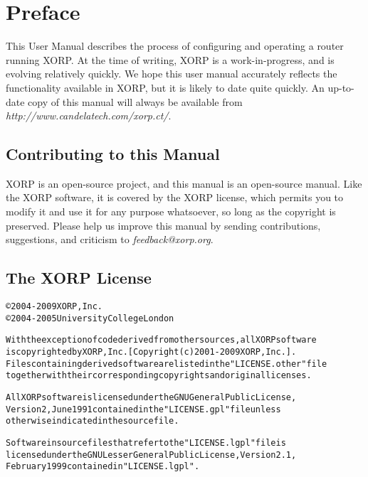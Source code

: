 %
%

\chapter*{Preface}

\vspace{-0.1in}
This User Manual describes the process of configuring and operating a
router running XORP.  At the time of writing, XORP is a
work-in-progress, and is evolving relatively quickly.  We hope this
user manual accurately reflects the functionality available in XORP,
but it is likely to date quite quickly.  An up-to-date copy of this
manual will always be available from {\it http://www.candelatech.com/xorp.ct/}.

\section*{Contributing to this Manual}
\vspace{-0.1in}
XORP is an open-source project, and this manual is an open-source
manual.  Like the XORP software, it is covered by the XORP license,
which permits you to modify it and use it for any purpose whatsoever,
so long as the copyright is preserved.  Please help us improve this
manual by sending contributions, suggestions, and criticism to {\it
  feedback@xorp.org}.

\section*{The XORP License}
\vspace{-0.3in}
\begin{alltt}
\small\noindent
\copyright 2004-2009 XORP, Inc.
\copyright 2004-2005 University College London

With the exception of code derived from other sources, all XORP software
is copyrighted by XORP, Inc. [Copyright (c) 2001-2009 XORP, Inc.].
Files containing derived software are listed in the "LICENSE.other" file
together with their corresponding copyrights and original licenses.

All XORP software is licensed under the GNU General Public License,
Version 2, June 1991 contained in the "LICENSE.gpl" file unless
otherwise indicated in the source file.

Software in source files that refer to the "LICENSE.lgpl" file is
licensed under the GNU Lesser General Public License, Version 2.1,
February 1999 contained in "LICENSE.lgpl".
\end{alltt}

